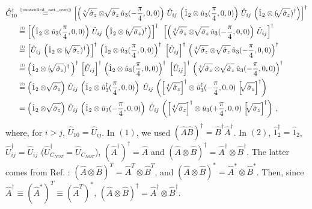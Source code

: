 \documentclass[11pt]{article}
\numberwithin{equation}{section} %
\numberwithin{figure}{section} %
\newcommand\numeq[1] %
  {\stackrel{\scriptscriptstyle(\mkern-1.5mu#1\mkern-1.5mu)}{=}}
\begin{document}
\begin{appendices}
\begin{equation}
\begin{split}
\hat{C}_{10}^\dagger
&	\numeq{\textrm{\ref{controlled_not_root}}}
\left[  \left( \sqrt[4]{\hat{\sigma}_z}\otimes\sqrt[]{\hat{\sigma}_z}\, \hat{u}_3(-\frac{\pi}{4},0,0) \right)\,\hat{U}_{ij}\, \left(\hat{1}_2\otimes\hat{u}_3(\frac{\pi}{4},0,0)\right)\,\hat{U}_{ij}\,	\left(\hat{1}_2\otimes(\sqrt[]{\hat{\sigma}_z})^\dagger\right)\right]^\dagger\\
&	\numeq{1}\left[\left(\hat{1}_2\otimes\hat{u}_3(\frac{\pi}{4},0,0)\right)\,\hat{U}_{ij}\,	\left(\hat{1}_2\otimes(\sqrt[]{\hat{\sigma}_z})^\dagger\right)\right]^\dagger \,\,\,\left[  \left( \sqrt[4]{\hat{\sigma}_z}\otimes\sqrt[]{\hat{\sigma}_z}\, \hat{u}_3(-\frac{\pi}{4},0,0) \right)\,\hat{U}_{ij}\right]^\dagger\\
&	\numeq{1} \left[\hat{U}_{ij}\,	\left(\hat{1}_2\otimes(\sqrt[]{\hat{\sigma}_z})^\dagger\right)\right]^\dagger\,\left(\hat{1}_2\otimes\hat{u}_3(\frac{\pi}{4},0,0)\right)^\dagger\,\,\left[\hat{U}_{ij}\right]^\dagger\,\left( \sqrt[4]{\hat{\sigma}_z}\otimes\sqrt[]{\hat{\sigma}_z}\, \hat{u}_3(-\frac{\pi}{4},0,0) \right)^\dagger\\
&	\numeq{1} \left(\hat{1}_2\otimes(\sqrt[]{\hat{\sigma}_z})^\dagger\,\right)^\dagger\,\left[\hat{U}_{ij}\right]^\dagger\,\left(\hat{1}_2\otimes\hat{u}_3(\frac{\pi}{4},0,0)\right)^\dagger\,\,\left[\hat{U}_{ij}\right]^\dagger\,\left( \sqrt[4]{\hat{\sigma}_z}\otimes\sqrt[]{\hat{\sigma}_z}\, \hat{u}_3(-\frac{\pi}{4},0,0) \right)^\dagger\\
&	\numeq{2} \left(\hat{1}_2\otimes\sqrt[]{\hat{\sigma}_z}\right)\,\hat{U}_{ij}\,\left(\hat{1}_2\otimes\hat{u}_3^\dagger(\frac{\pi}{4},0,0)\right)\,\,\hat{U}_{ij}\,\left( \left[\sqrt[4]{\hat{\sigma}_z}\right]^\dagger\otimes \hat{u}_3^\dagger(-\frac{\pi}{4},0,0)\,\left[\sqrt[]{\hat{\sigma}_z}\right]^\dagger \right)\\
&	=\left(\hat{1}_2\otimes\sqrt[]{\hat{\sigma}_z}\right)\,\hat{U}_{ij}\,\left(\hat{1}_2\otimes\hat{u}_3(-\frac{\pi}{4},0,0)\right)\,\,\hat{U}_{ij}\,\left( \left[\sqrt[4]{\hat{\sigma}_z}\right]^\dagger\otimes \hat{u}_3(+\frac{\pi}{4},0,0)\,\left[\sqrt[]{\hat{\sigma}_z}\right]^\dagger \right)\,,
\end{split}
\end{equation}
where, for $i>j$, $\hat{U}_{10}=\hat{U}_{ij}$. In $(1)$, we used $\left(\hat{A}\hat{B}\right)^\dagger=\hat{B}^\dagger\hat{A}^\dagger$. In $(2)$, $\hat{1}_2^\dagger=\hat{1}_2$, $\hat{U}_{ij}^\dagger=\hat{U}_{ij}$ ($\hat{U}_{C_{NOT}}^\dagger = \hat{U}_{C_{NOT}}$), $\left(\hat{A}^\dagger\right)^\dagger=\hat{A}$ and $\left( \hat{A}\otimes\hat{B}\right)^\dagger=\hat{A}^\dagger\otimes\hat{B}^\dagger$. The latter comes from Ref. \cite[p.~74, Eq.~(2.53)]{Nielsen}: $(\hat{A}\otimes\hat{B})^T=\hat{A}^T\otimes\hat{B}^T$, and $(\hat{A}\otimes\hat{B})^*=\hat{A}^*\otimes\hat{B}^*$. Then, since $\hat{A}^\dagger\equiv(\hat{A}^*)^T\equiv(\hat{A}^T)^*$, $(\hat{A}\otimes\hat{B})^\dagger=\hat{A}^\dagger\otimes\hat{B}^\dagger$.


\end{appendices}
\end{document}
